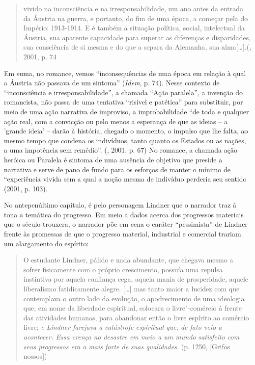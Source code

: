 \begin{quote}
vivido na inconsciência e na irresponsabilidade, um ano antes da entrada
da Áustria na guerra, e portanto, do fim de uma época, a começar pela do
Império: 1913-1914. E é também a situação política, social, intelectual
da Áustria, sua aparente capacidade para superar as diferenças e
disparidades, sua consciência de si mesma e do que a separa da Alemanha,
sua alma[\ldots{}].(, 2001, p. 74
\end{quote}

Em suma, no romance, vemos ``inconsequências de uma época em relação à
qual a Áustria não passava de um sintoma'' (\emph{Idem}, p. 74). Nesse
contexto de ``inconsciência e irresponsabilidade'', a chamada ``Ação
paralela'', a invenção do romancista, não passa de uma tentativa
``risível e patética'' para substituir, por meio de uma ação narrativa
de improviso, a improbabilidade ``de toda e qualquer ação real, com a
convicção ou pelo menos a esperança de que as ideias -- a 'grande ideia'
-- darão à história, chegado o momento, o impulso que lhe falta, ao
mesmo tempo que condena os indivíduos, tanto quanto os Estados ou as
nações, a uma impotência sem remédio''. (, 2001, p. 67) No
romance, a chamada ação heróica ou Paralela é sintoma de uma ausência de
objetivo que preside a narrativa e serve de pano de fundo para os
esforços de manter o mínimo de ``experiência vivida sem a qual a noção
mesma de indivíduo perderia seu sentido (2001, p. 103).

No antepenúltimo capítulo, é pelo personagem Lindner que o narrador traz
à tona a temática do progresso. Em meio a dados acerca dos progressos
materiais que o século  trouxera, o narrador põe em cena o caráter
``pessimista'' de Lindner frente às promessas de que o progresso
material, industrial e comercial trariam um alargamento do espírito:

\begin{quote}
O estudante Lindner, pálido e nada abundante, que chegava mesmo a sofrer
fisicamente com o próprio crescimento, possuía uma repulsa instintiva
por aquela confiança cega, aquela mania de prosperidade, aquele
liberalismo fatidicamente alegre. [\ldots{}] mas tanto maior a
lucidez com que contemplava o outro lado da evolução, o apodrecimento de
uma ideologia que, em nome da liberdade espiritual, colocara o
livre"-comércio à frente das atividades humanas, para abandonar então o
livre espírito ao comércio livre; \emph{e Lindner farejava a catástrofe
espiritual que, de fato veio a acontecer. Essa crença no desastre em
meio a um mundo satisfeito com seus progressos era a mais forte de suas
qualidades.} (p. 1250, [Grifos nossos])
\end{quote}

